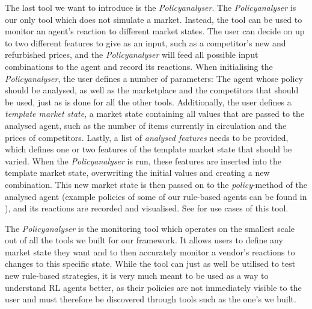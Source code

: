The last tool we want to introduce is the \emph{Policyanalyser}. The \emph{Policyanalyser} is our only tool which does not simulate a market. Instead, the tool can be used to monitor an agent's reaction to different market states. The user can decide on up to two different features to give as an input, such as a competitor's new and refurbished prices, and the \emph{Policyanalyser} will feed all possible input combinations to the agent and record its reactions. When initialising the \emph{Policyanalyser}, the user defines a number of parameters: The agent whose policy should be analysed, as well as the marketplace and the competitors that should be used, just as is done for all the other tools. Additionally, the user defines a \emph{template market state}, a market state containing all values that are passed to the analysed agent, such as the number of items currently in circulation and the prices of competitors. Lastly, a list of \emph{analysed features} needs to be provided, which defines one or two features of the template market state that should be varied. When the \emph{Policyanalyser} is run, these features are inserted into the template market state, overwriting the initial values and creating a new combination. This new market state is then passed on to the \emph{policy}-method of the analysed agent (example policies of some of our rule-based agents can be found in ), and its reactions are recorded and visualised. See  for use cases of this tool.

The \emph{Policyanalyser} is the monitoring tool which operates on the smallest scale out of all the tools we built for our framework. It allows users to define any market state they want and to then accurately monitor a vendor's reactions to changes to this specific state. While the tool can just as well be utilised to test new rule-based strategies, it is very much meant to be used as a way to understand RL agents better, as their policies are not immediately visible to the user and must therefore be discovered through tools such as the one's we built.

